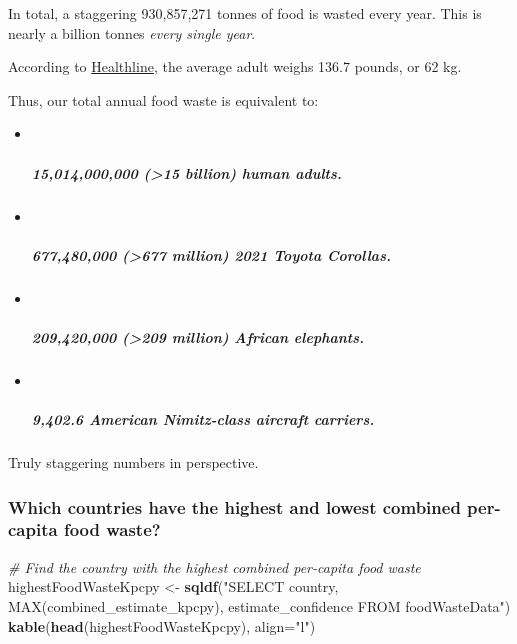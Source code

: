 \documentclass[
]{article}
\newenvironment{Shaded}{\begin{snugshade}}{\end{snugshade}}
\newcommand{\AttributeTok}[1]{\textcolor[rgb]{0.13,0.29,0.53}{#1}}
\newcommand{\CommentTok}[1]{\textcolor[rgb]{0.56,0.35,0.01}{\textit{#1}}}
\newcommand{\FunctionTok}[1]{\textcolor[rgb]{0.13,0.29,0.53}{\textbf{#1}}}
\newcommand{\NormalTok}[1]{#1}
\newcommand{\OtherTok}[1]{\textcolor[rgb]{0.56,0.35,0.01}{#1}}
\newcommand{\StringTok}[1]{\textcolor[rgb]{0.31,0.60,0.02}{#1}}
\begin{document}
In total, a staggering 930,857,271 tonnes of food is wasted every year.
This is nearly a billion tonnes \emph{every single year}.

According to
\href{https://www.healthline.com/health/mens-health/average-weight-for-men}{Healthline},
the average adult weighs 136.7 pounds, or 62 kg.

Thus, our total annual food waste is equivalent to:

\begin{itemize}
\item ~
  \hypertarget{billion-human-adults.}{%
  \subparagraph{\texorpdfstring{\textbf{15,014,000,000 (\textgreater15
  billion) human
  adults.}}{15,014,000,000 (\textgreater15 billion) human adults.}}\label{billion-human-adults.}}
\item ~
  \hypertarget{million-2021-toyota-corollas.}{%
  \subparagraph{\texorpdfstring{\textbf{677,480,000 (\textgreater677
  million) 2021 Toyota
  Corollas.}}{677,480,000 (\textgreater677 million) 2021 Toyota Corollas.}}\label{million-2021-toyota-corollas.}}
\item ~
  \hypertarget{million-african-elephants.}{%
  \subparagraph{\texorpdfstring{\textbf{209,420,000 (\textgreater209
  million) African
  elephants.}}{209,420,000 (\textgreater209 million) African elephants.}}\label{million-african-elephants.}}
\item ~
  \hypertarget{american-nimitz-class-aircraft-carriers.}{%
  \subparagraph{\texorpdfstring{\textbf{9,402.6 American Nimitz-class
  aircraft
  carriers.}}{9,402.6 American Nimitz-class aircraft carriers.}}\label{american-nimitz-class-aircraft-carriers.}}
\end{itemize}

Truly staggering numbers in perspective.

\hypertarget{which-countries-have-the-highest-and-lowest-combined-per-capita-food-waste}{%
\subsubsection{Which countries have the highest and lowest combined
per-capita food
waste?}\label{which-countries-have-the-highest-and-lowest-combined-per-capita-food-waste}}

\begin{Shaded}
\begin{Highlighting}[]
\CommentTok{\# Find the country with the highest combined per{-}capita food waste}
\NormalTok{highestFoodWasteKpcpy }\OtherTok{\textless{}{-}} \FunctionTok{sqldf}\NormalTok{(}\StringTok{"SELECT country, MAX(combined\_estimate\_kpcpy), estimate\_confidence FROM foodWasteData"}\NormalTok{)}
\FunctionTok{kable}\NormalTok{(}\FunctionTok{head}\NormalTok{(highestFoodWasteKpcpy), }\AttributeTok{align=}\StringTok{"l"}\NormalTok{)}
\end{Highlighting}
\end{Shaded}
\end{document}
